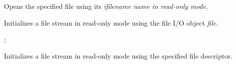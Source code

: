 


Opens the specified file using its \it{ifilename} name in read-only mode.


Initializes a file stream in read-only mode using the file I/O object \it{file}.

;

Initializes a file stream in read-only mode using the specified file descriptor.

